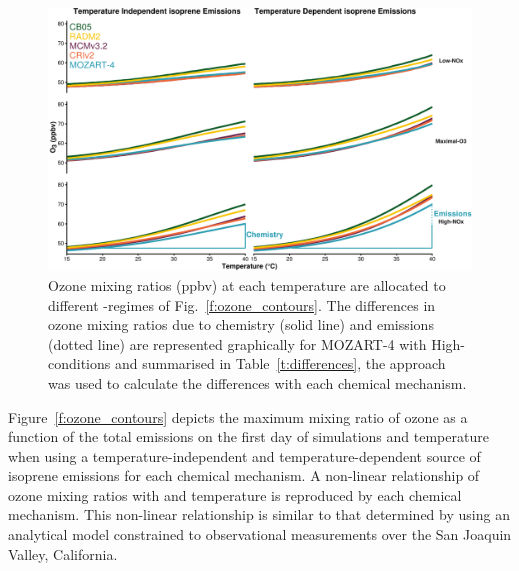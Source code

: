 \begin{figure}[t]%
    \centering%
    \caption{Ozone mixing ratios (ppbv) at each temperature are allocated to different -regimes of Fig.~\ref{f:ozone_contours}. The differences in ozone mixing ratios due to chemistry (solid line) and emissions (dotted line) are represented graphically for MOZART-4 with High- conditions and summarised in Table~\ref{t:differences}, the approach was used to calculate the differences with each chemical mechanism.}%
    \label{f:O3-T}%
    \includegraphics[width=\textwidth]{img/O3-T_correlation}%
    \vspace{-4mm}
\end{figure}

\begin{table}[t]%
    \centering%
    \caption{Increase in ozone mixing ratio (ppbv) due to chemistry and temperature-dependent isoprene emissions from the reference temperature ($20$~\degree C) at $40$~\degree C in the -regimes of Fig.~\ref{f:O3-T}.}%
    \label{t:differences}%
    \vspace{-4mm}
\end{table}

Figure~\ref{f:ozone_contours} depicts the maximum mixing ratio of ozone as a function of the total  emissions on the first day of simulations and temperature when using a temperature-independent and temperature-dependent source of isoprene emissions for each chemical mechanism.
A non-linear relationship of ozone mixing ratios with  and temperature is reproduced by each chemical mechanism.
This non-linear relationship is similar to that determined by \citet{Pusede:2014} using an analytical model constrained to observational measurements over the San Joaquin Valley, California.

